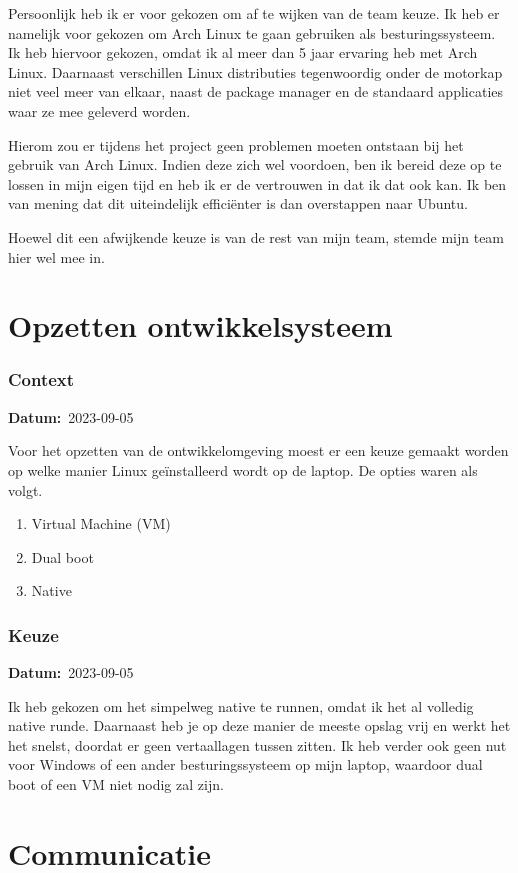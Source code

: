\documentclass[a4paper]{report}
\newcommand{\teambox}{
  \begin{tcolorbox}[hbox, colback=blue!5!white,colframe=blue!75!black,
    left=.1mm, right=.1mm, top=.1mm, bottom=.1mm, fontupper=\scriptsize\sffamily]
    Team Keuze
  \end{tcolorbox}
}
\newcommand{\personalbox}{
  \begin{tcolorbox}[hbox, colback=green!5!white,colframe=green!75!black,
    left=.1mm, right=.1mm, top=.1mm, bottom=.1mm, fontupper=\scriptsize\sffamily]
    Persoonlijke Keuze
  \end{tcolorbox}
}
\newcommand{\teamchoice}[1]{
  \section[ #1 ]{#1~\mbox{\raisebox{-2.5pt}{\teambox}}}
}
\newcommand{\personalchoice}[1]{
  \section[ #1 ]{#1~\mbox{\raisebox{-2.5pt}{\personalbox}}}
}
\newcommand{\timestamp}[1]{
  \mbox{\scriptsize \textbf{Datum:} #1} \smallbreak
}
\begin{document}
Persoonlijk heb ik er voor gekozen om af te wijken van de team keuze. 
Ik heb er namelijk voor gekozen om Arch Linux te gaan gebruiken als besturingssysteem.
Ik heb hiervoor gekozen, omdat ik al meer dan 5 jaar ervaring heb met Arch Linux. 
Daarnaast verschillen Linux distributies tegenwoordig onder de motorkap niet veel meer van elkaar, naast de package manager en de standaard applicaties waar ze mee geleverd worden.
\par \smallskip
Hierom zou er tijdens het project geen problemen moeten ontstaan bij het gebruik van Arch Linux. 
Indien deze zich wel voordoen, ben ik bereid deze op te lossen in mijn eigen tijd en heb ik er de vertrouwen in dat ik dat ook kan.
Ik ben van mening dat dit uiteindelijk efficiënter is dan overstappen naar Ubuntu.
\par \smallskip
Hoewel dit een afwijkende keuze is van de rest van mijn team, stemde mijn team hier wel mee in.

\personalchoice{Opzetten ontwikkelsysteem}
\subsubsection{Context}
\timestamp{2023-09-05}
Voor het opzetten van de ontwikkelomgeving moest er een keuze gemaakt worden op welke manier Linux geïnstalleerd wordt op de laptop. 
De opties waren als volgt.
\begin{enumerate}
  \item Virtual Machine (VM)
  \item Dual boot
  \item Native
\end{enumerate}

\subsubsection{Keuze}
\timestamp{2023-09-05}
Ik heb gekozen om het simpelweg native te runnen, omdat ik het al volledig native runde. 
Daarnaast heb je op deze manier de meeste opslag vrij en werkt het het snelst, doordat er geen vertaallagen tussen zitten.
Ik heb verder ook geen nut voor Windows of een ander besturingssysteem op mijn laptop, waardoor dual boot of een VM niet nodig zal zijn.

\teamchoice{Communicatie}
\end{document}
